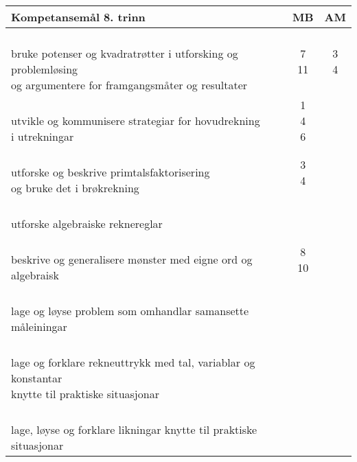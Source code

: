 \documentclass{article}
\begin{document}
\begin{center}
	\begin{tabular}{p{10.5cm} | c | c |} 
		\textbf{Kompetansemål 8. trinn} & \textbf{MB} & \textbf{AM}\\ \hline
		\shortstack[l]{\\ bruke potenser og kvadratrøtter i utforsking og problemløsing\\ og argumentere for framgangsmåter og resultater
		} &\shortstack{7\\ 11} &\shortstack{3 \\ 4} \\ \hline
		
		\shortstack[l]{\\utvikle og kommunisere strategiar for hovudrekning \\i utrekningar \\{}
		} &\shortstack{1 \\ 4\\6} &\shortstack{} \\ \hline
		
		\shortstack[l]{\\ utforske og beskrive primtalsfaktorisering \\og bruke det i brøkrekning
		} &\shortstack{3\\4} &\shortstack{} \\ \hline
		
		\shortstack[l]{\\ utforske algebraiske reknereglar
		} &\shortstack{7} &\shortstack{} \\ \hline
		
		\shortstack[l]{\\ beskrive og generalisere mønster med eigne ord og algebraisk \\ \phantom{a}
		} &\shortstack{8\\10} &\shortstack{} \\ \hline
		
		\shortstack[l]{\\lage og løyse problem som omhandlar samansette måleiningar
		} &\shortstack{} &\shortstack{1} \\ \hline
		
		\shortstack[l]{\\ lage og forklare rekneuttrykk med tal, variablar og konstantar \\knytte til praktiske situasjonar
		} &\shortstack{} &\shortstack{alle} \\ \hline
		
		\shortstack[l]{\\ lage, løyse og forklare likningar knytte til praktiske situasjonar \\\phantom{text}
		} &\shortstack{} &\shortstack{6} \\ \hline
		

\end{tabular}
\end{center}
\end{document}
